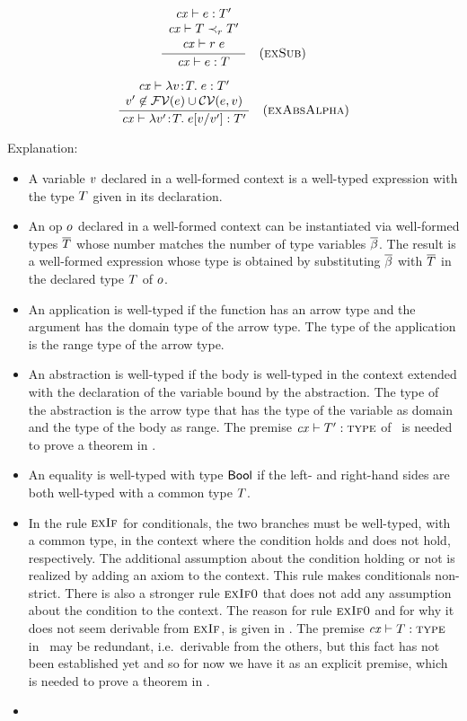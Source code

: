 \[
\frac{\begin{array}{c}\mathit{cx}\vdash e:T'\\\mathit{cx}\vdash T\prec_{r}T'\\\mathit{cx}\vdash r\;e\end{array}}{\mathit{cx}\vdash e:T}\quad\mbox{(\textsc{exSub})}
\]

\[
\frac{\begin{array}{c}\mathit{cx}\vdash\lambda v\!:\!T.\;e:T'\\v'\not\in\mathcal{FV}(e)\cup\mathcal{CV}(e,v)\end{array}}{\mathit{cx}\vdash\lambda v'\!:\!T.\;e[v/v']:T'}\quad\mbox{(\textsc{exAbsAlpha})}
\]

Explanation:
\begin{itemize}
\item
A variable $v$ declared in a well-formed context is a well-typed expression
with the type $T$ given in its declaration.
\item
An op $o$ declared in a well-formed context can be instantiated via
well-formed types $\overline{T}$ whose number matches the number of type variables
$\overline{\beta}$. The result is a well-formed expression whose type is obtained by
substituting $\overline{\beta}$ with $\overline{T}$ in the declared type $T$ of $o$.
\item
An application is well-typed if the function has an arrow type and the
argument has the domain type of the arrow type. The type of the application is
the range type of the arrow type.
\item
An abstraction is well-typed if the body is well-typed in the context extended
with the declaration of the variable bound by the abstraction. The type of the
abstraction is the arrow type that has the type of the variable as domain and
the type of the body as range. The premise $\mathit{cx}\vdash T':\textsc{type}$ of \Reabs\ is
needed to prove a theorem in .
\item
An equality is well-typed with type $\mathsf{Bool}$ if the left- and right-hand sides
are both well-typed with a common type $T$.
\item
In the rule $\textsc{exIf}$ for conditionals, the two branches must be well-typed,
with a common type, in the context where the condition holds and does not
hold, respectively. The additional assumption about the condition holding or
not is realized by adding an axiom to the context. This rule makes
conditionals non-strict. There is also a stronger rule $\textsc{exIf0}$ that does not
add any assumption about the condition to the context. The reason for rule
$\textsc{exIf0}$ and for why it does not seem derivable from $\textsc{exIf}$, is given in
. The premise $\mathit{cx}\vdash T:\textsc{type}$ in \Reif\ may be redundant, i.e.\
derivable from the others, but this fact has not been established yet and so
for now we have it as an explicit premise, which is needed to prove a theorem
in \secref{props}.
\item

\end{itemize}
